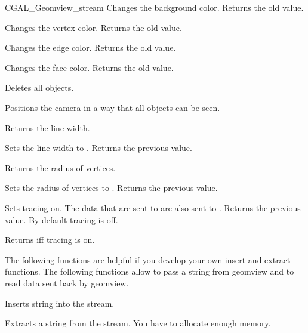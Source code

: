 \begin{ccClass}{CGAL_Geomview_stream}
{Changes the background color. Returns the old value.}

{Changes the vertex color. Returns the old value.}

{Changes the edge color. Returns the old value.}


{Changes the face color. Returns the old value.}



{Deletes all objects.}

{Positions the camera in a way that all objects can be seen.}

{Returns the line width.}

{Sets the line width to . Returns the previous value.}

{Returns the radius of vertices.}

{Sets the radius of vertices to . Returns the previous value.}

{Sets tracing on. The data that are sent to  are also
 sent to .  Returns the previous value. By default tracing is
 off.}

{Returns  iff tracing is on.}


\begin{ccAdvanced}


The following functions are helpful if you develop your own insert
and extract functions. The following functions allow to pass a string
from geomview and to read data sent back by geomview.

{Inserts string  into the stream.}


{Extracts a string  from the stream.
\ccPrecond You have to allocate enough memory.}


\end{ccAdvanced}
\end{ccClass}
